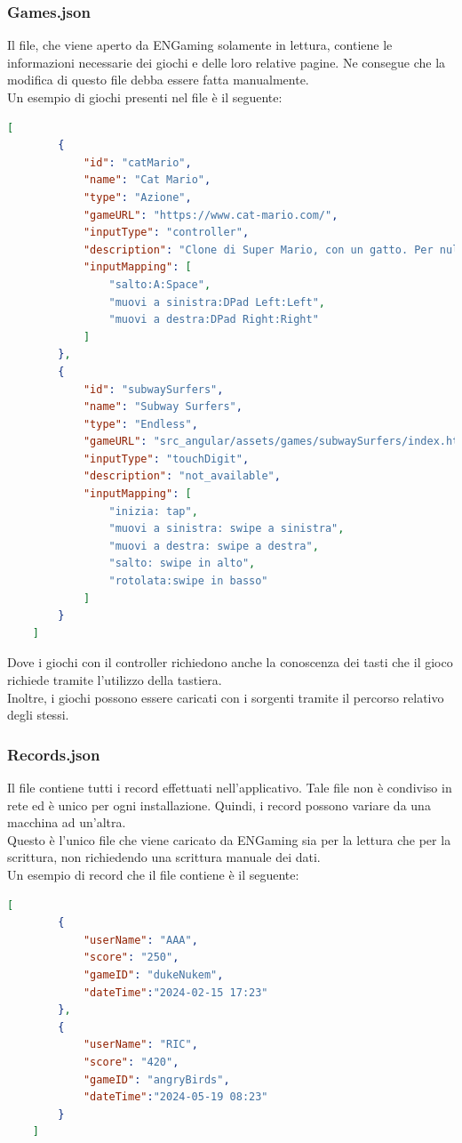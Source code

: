 \subsubsection{Games.json}
Il file, che viene aperto da ENGaming solamente in lettura, contiene le informazioni necessarie dei giochi e delle loro relative pagine. Ne consegue che la modifica di questo file debba essere fatta manualmente.\\
Un esempio di giochi presenti nel file è il seguente:
\begin{lstlisting}[language=json,firstnumber=1]
    [
        {
            "id": "catMario",
            "name": "Cat Mario",
            "type": "Azione",
            "gameURL": "https://www.cat-mario.com/",
            "inputType": "controller",
            "description": "Clone di Super Mario, con un gatto. Per nulla stressante!",
            "inputMapping": [
                "salto:A:Space",
                "muovi a sinistra:DPad Left:Left",
                "muovi a destra:DPad Right:Right"
            ]
        },
        {
            "id": "subwaySurfers",
            "name": "Subway Surfers",
            "type": "Endless",
            "gameURL": "src_angular/assets/games/subwaySurfers/index.html",
            "inputType": "touchDigit",
            "description": "not_available",
            "inputMapping": [
                "inizia: tap",
                "muovi a sinistra: swipe a sinistra",
                "muovi a destra: swipe a destra",
                "salto: swipe in alto",
                "rotolata:swipe in basso"
            ]
        }
    ]
\end{lstlisting}
Dove i giochi con il controller richiedono anche la conoscenza dei tasti che il gioco richiede tramite l'utilizzo della tastiera.\\
Inoltre, i giochi possono essere caricati con i sorgenti tramite il percorso relativo degli stessi.
\newpage
\subsubsection{Records.json}
Il file contiene tutti i record effettuati nell'applicativo. Tale file non è condiviso in rete ed è unico per ogni installazione. Quindi, i record possono variare da una macchina ad un'altra.\\
Questo è l'unico file che viene caricato da ENGaming sia per la lettura che per la scrittura, non richiedendo una scrittura manuale dei dati.\\
Un esempio di record che il file contiene è il seguente:
\begin{lstlisting}[language=json,firstnumber=1]
    [
        {
            "userName": "AAA",
            "score": "250",
            "gameID": "dukeNukem",
            "dateTime":"2024-02-15 17:23"
        },
        {
            "userName": "RIC",
            "score": "420",
            "gameID": "angryBirds",
            "dateTime":"2024-05-19 08:23"
        }
    ]
\end{lstlisting}